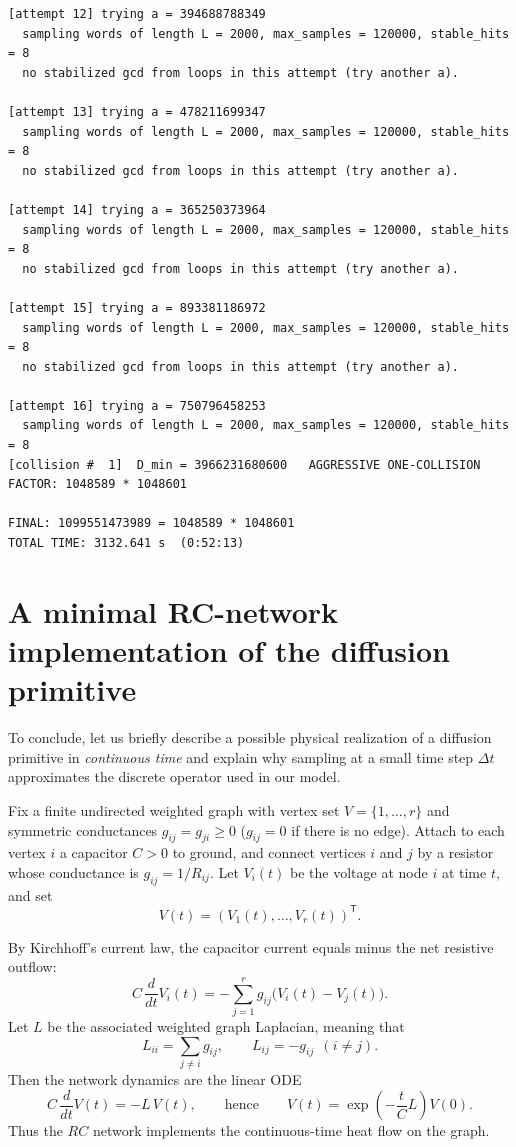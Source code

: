 \documentclass[11pt,reqno]{article}
\numberwithin{equation}{section}
\theoremstyle{plain}
\theoremstyle{definition}
\theoremstyle{remark}
\begin{document}
\begin{verbatim}
[attempt 12] trying a = 394688788349
  sampling words of length L = 2000, max_samples = 120000, stable_hits = 8
  no stabilized gcd from loops in this attempt (try another a).

[attempt 13] trying a = 478211699347
  sampling words of length L = 2000, max_samples = 120000, stable_hits = 8
  no stabilized gcd from loops in this attempt (try another a).

[attempt 14] trying a = 365250373964
  sampling words of length L = 2000, max_samples = 120000, stable_hits = 8
  no stabilized gcd from loops in this attempt (try another a).

[attempt 15] trying a = 893381186972
  sampling words of length L = 2000, max_samples = 120000, stable_hits = 8
  no stabilized gcd from loops in this attempt (try another a).

[attempt 16] trying a = 750796458253
  sampling words of length L = 2000, max_samples = 120000, stable_hits = 8
[collision #  1]  D_min = 3966231680600   AGGRESSIVE ONE-COLLISION FACTOR: 1048589 * 1048601

FINAL: 1099551473989 = 1048589 * 1048601
TOTAL TIME: 3132.641 s  (0:52:13)
\end{verbatim}



\section{A minimal RC-network implementation of the diffusion primitive}
\label{7}

To conclude, let us
briefly describe a possible physical realization of a diffusion primitive in \emph{continuous time}
and explain why sampling at a small time step $\Delta t$ approximates the discrete operator
used in our model.

Fix a finite undirected weighted graph with vertex set $V=\{1,\dots,r\}$ and symmetric
conductances $g_{ij}=g_{ji}\ge 0$ ($g_{ij}=0$ if there is no edge).
Attach to each vertex $i$ a capacitor $C>0$ to ground, and connect vertices $i$ and $j$
by a resistor whose conductance is $g_{ij}=1/R_{ij}$.
Let $V_i(t)$ be the voltage at node $i$ at time $t$, and set
\[
V(t)=(V_1(t),\dots,V_r(t))^{\mathsf T}.
\]

By Kirchhoff's current law, the capacitor current equals minus the net resistive outflow:
\[
C\,\frac{d}{dt}V_i(t) = -\sum_{j=1}^r g_{ij}\bigl(V_i(t)-V_j(t)\bigr).
\]
Let $L$ be the associated weighted graph Laplacian, meaning that
\[
L_{ii}=\sum_{j\ne i} g_{ij},
\qquad
L_{ij}=-g_{ij}\ \ (i\ne j).
\]
Then the network dynamics are the linear ODE
\begin{equation}\label{eq:cont-diffusion}
C\,\frac{d}{dt}V(t) = -L\,V(t),
\qquad\text{hence}\qquad
V(t)=\exp\!\left(-\frac{t}{C}L\right)V(0).
\end{equation}
Thus the $RC$ network implements the continuous-time heat flow on the graph.
\end{document}

